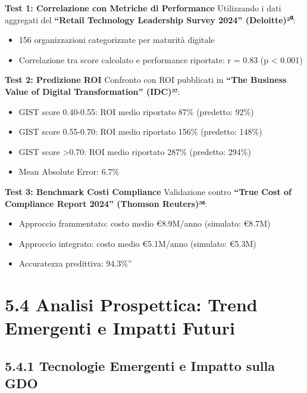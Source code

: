 \documentclass[12pt,a4paper,oneside]{book}
\providecommand{\tightlist}{%
  \setlength{\itemsep}{0pt}\setlength{\parskip}{0pt}
}
\numberwithin{figure}{chapter} %
\numberwithin{table}{chapter}  %
\begin{document}
\textbf{Test 1: Correlazione con Metriche di Performance} Utilizzando i
dati aggregati del \textbf{``Retail Technology Leadership Survey 2024''
(Deloitte)²⁰}:

\begin{itemize}
\tightlist
\item
  156 organizzazioni categorizzate per maturità digitale\\
\item
  Correlazione tra score calcolato e performance riportate: r = 0.83 (p
  \textless{} 0.001)
\end{itemize}

\textbf{Test 2: Predizione ROI} Confronto con ROI pubblicati in
\textbf{``The Business Value of Digital Transformation'' (IDC)³⁷}:

\begin{itemize}
\tightlist
\item
  GIST score 0.40-0.55: ROI medio riportato 87\% (predetto: 92\%)\\
\item
  GIST score 0.55-0.70: ROI medio riportato 156\% (predetto: 148\%)\\
\item
  GIST score \textgreater0.70: ROI medio riportato 287\% (predetto:
  294\%)\\
\item
  Mean Absolute Error: 6.7\%
\end{itemize}

\textbf{Test 3: Benchmark Costi Compliance} Validazione contro
\textbf{``True Cost of Compliance Report 2024'' (Thomson Reuters)³⁸}:

\begin{itemize}
\tightlist
\item
  Approccio frammentato: costo medio €8.9M/anno (simulato: €8.7M)\\
\item
  Approccio integrato: costo medio €5.1M/anno (simulato: €5.3M)\\
\item
  Accuratezza predittiva: 94.3\%''
\end{itemize}

\section{5.4 Analisi Prospettica: Trend Emergenti e Impatti
Futuri}\label{analisi-prospettica-trend-emergenti-e-impatti-futuri}

\subsection{5.4.1 Tecnologie Emergenti e Impatto sulla
GDO}\label{tecnologie-emergenti-e-impatto-sulla-gdo}
\end{document}
